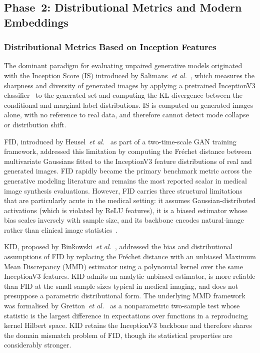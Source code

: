 \documentclass[lettersize,journal]{IEEEtran}
\begin{document}
\subsection{Phase~2: Distributional Metrics and Modern Embeddings}
\label{sec:related_phase2}

\subsubsection{Distributional Metrics Based on Inception Features}
\label{sec:related_distributional}

The dominant paradigm for evaluating unpaired generative models originated
with the Inception Score (IS) introduced by
Salimans~\textit{et al.}~\cite{salimans2016is}, which measures the
sharpness and diversity of generated images by applying a pretrained
InceptionV3 classifier~\cite{szegedy2016rethinking} to the generated set
and computing the KL divergence between the conditional and marginal label
distributions. IS is computed on generated images alone, with no reference to
real data, and therefore cannot detect mode collapse or distribution shift.

FID, introduced by
Heusel~\textit{et al.}~\cite{heusel2017gans} as part of a two-time-scale GAN
training framework, addressed this limitation by computing the
Fr\'{e}chet distance between multivariate Gaussians fitted to the
InceptionV3 feature distributions of real and generated images. FID rapidly
became the primary benchmark metric across the generative modeling literature
and remains the most reported scalar in medical image synthesis evaluations.
However, FID carries three structural limitations that are particularly acute
in the medical setting: it assumes Gaussian-distributed activations (which is
violated by ReLU features), it is a biased estimator whose bias scales
inversely with sample size, and its backbone encodes natural-image rather than
clinical image statistics~\cite{kelkar2023assessing,skandarani2023gans}.

KID, proposed by
Bin\'{k}owski~\textit{et al.}~\cite{binkowski2018demystifying}, addressed
the bias and distributional assumptions of FID by replacing the
Fr\'{e}chet distance with an unbiased Maximum Mean Discrepancy (MMD) estimator
using a polynomial kernel over the same InceptionV3 features. KID admits an
analytic unbiased estimator, is more reliable than FID at the small sample
sizes typical in medical imaging, and does not presuppose a parametric
distributional form. The underlying MMD framework was formalised by
Gretton~\textit{et al.}~\cite{gretton2012kernel} as a nonparametric
two-sample test whose statistic is the largest difference in expectations over
functions in a reproducing kernel Hilbert space. KID retains the
InceptionV3 backbone and therefore shares the domain mismatch problem of FID,
though its statistical properties are considerably stronger.
\end{document}
